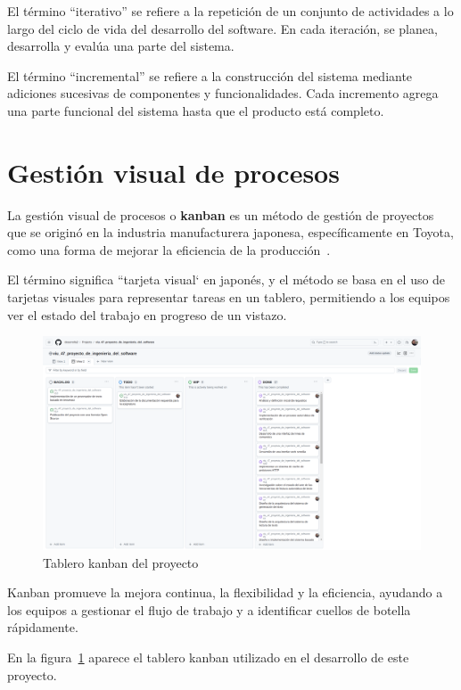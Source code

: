 El término ``iterativo'' se refiere a la repetición de un conjunto de actividades a lo largo del ciclo de vida del
desarrollo del software.
En cada iteración, se planea, desarrolla y evalúa una parte del sistema.

El término ``incremental'' se refiere a la construcción del sistema mediante adiciones sucesivas de componentes y
funcionalidades.
Cada incremento agrega una parte funcional del sistema hasta que el producto está completo.


\section{Gestión visual de procesos}

La gestión visual de procesos o \textbf{kanban} es un método de gestión de proyectos que se originó en la industria
manufacturera japonesa, específicamente en Toyota, como una forma de mejorar la eficiencia de la
producción~\cite{book_anderson_2010}.

El término significa ``tarjeta visual` en japonés, y el método se basa en el uso de tarjetas visuales para
representar tareas en un tablero, permitiendo a los equipos ver el estado del trabajo en progreso de un
vistazo.

\begin{figure}[ht]
    \begin{center}
        \includegraphics[width=\textwidth]{./chapter/3/images/chapter_3.kanban}
        \caption{Tablero kanban del proyecto}
        \label{fig:chapter_3.kanban}
    \end{center}
\end{figure}

Kanban promueve la mejora continua, la flexibilidad y la eficiencia, ayudando a los equipos a gestionar el flujo de
trabajo y a identificar cuellos de botella rápidamente.

En la figura~\ref{fig:chapter_3.kanban} aparece el tablero kanban utilizado en el desarrollo de este proyecto.


